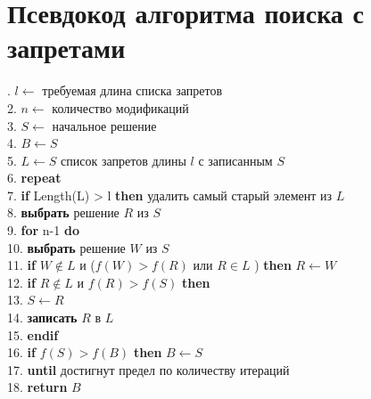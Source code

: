 \newpage

\section{Псевдокод алгоритма поиска с запретами}\label{ref:tabu}
. \( l \leftarrow \) требуемая длина списка запретов\\
2. \( n \leftarrow \) количество модификаций\\
3. \( S \leftarrow \) начальное решение\\
4. \( B \leftarrow S \)\\
5. \( L \leftarrow { S } \) список запретов длины \( l \) с записанным \( S \)\\
6. \textbf{repeat}\\
7. \hspace*{2em} \textbf{if} Length(L) > l \textbf{then} удалить самый старый элемент из \( L \) \\
8. \hspace*{2em} \textbf{выбрать} решение \( R \) из \( S \)\\
9. \hspace*{2em} \textbf{for} n-1 \textbf{do}\\
10. \hspace*{4em} \textbf{выбрать} решение \( W \) из \( S \)\\
11. \hspace*{4em} \textbf{if} \( W \notin L \) и (\( f(W) > f(R) \) или \( R \in L \) ) \textbf{then} \( R \leftarrow W \)\\
12. \hspace*{4em} \textbf{if} \( R \notin L \) и \( f(R) > f(S) \) \textbf{then}\\
13. \hspace*{6em} \( S \leftarrow R \)\\
14. \hspace*{6em} \textbf{записать} \( R \) в \( L \)\\
15. \hspace*{4em} \textbf{endif}\\
16. \hspace*{2em} \textbf{if} \( f(S) > f(B) \) \textbf{then} \( B \leftarrow S \)\\
17. \textbf{until} достигнут предел по количеству итераций\\
18. \textbf{return} \( B \)\\